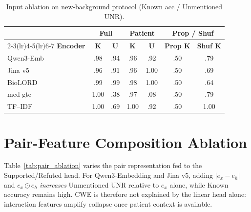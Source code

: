 \documentclass[11pt]{article}
\begin{document}
\begin{table}[!htbp]
  \centering
  \scriptsize
  \renewcommand{\arraystretch}{1.06}
  \caption{Input ablation on new-background protocol (Known acc /
  Unmentioned UNR).}
  \label{tab:input_ablation}
  \begin{tabular*}{\columnwidth}{@{\extracolsep{\fill}}lcccccc@{}}
    \toprule
    & \multicolumn{2}{c}{\textbf{Full}} &
    \multicolumn{2}{c}{\textbf{Patient}} &
    \multicolumn{2}{c}{\textbf{Prop / Shuf}} \\
    \cmidrule(lr){2-3}\cmidrule(lr){4-5}\cmidrule(lr){6-7}
    \textbf{Encoder} & \textbf{K} & \textbf{U} &
    \textbf{K} & \textbf{U} & \textbf{Prop K} & \textbf{Shuf K} \\
    \midrule
    Qwen3-Emb & .98 & .94 & .96 & .92 & .50 & .79 \\
    Jina v5   & .96 & .91 & .96 & 1.00 & .50 & .69 \\
    BioLORD   & .99 & .99 & .98 & 1.00 & .50 & .64 \\
    med-gte   & 1.00 & .38 & .97 & .08 & .50 & .79 \\
    TF--IDF   & 1.00 & .69 & 1.00 & .92 & .50 & 1.00 \\
    \bottomrule
  \end{tabular*}
\end{table}

\section{Pair-Feature Composition Ablation}
\label{app:pair_ablation}

Table~\ref{tab:pair_ablation} varies the pair representation fed to the
Supported/Refuted head. For Qwen3-Embedding and Jina v5, adding
$|e_x-e_h|$ and $e_x\odot e_h$ \emph{increases} Unmentioned UNR relative to
$e_x$ alone, while Known accuracy remains high. CWE is therefore not explained
by the linear head alone: interaction features amplify collapse once patient
context is available.
\end{document}
